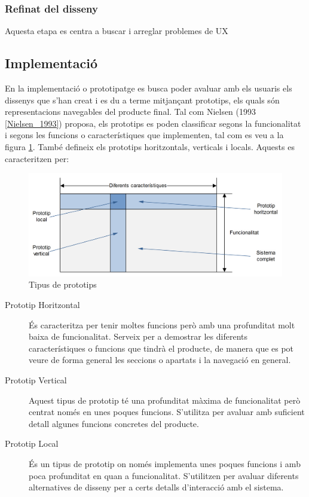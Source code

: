 \subsubsection{Refinat del disseny}
Aquesta etapa es centra a buscar i arreglar problemes de \ac{UX} 


\subsection{Implementació}\label{subsec:implementation}
En la implementació o prototipatge es busca poder avaluar amb els usuaris els dissenys que s'han creat i es du a terme mitjançant prototips, els quals són representacions navegables del producte final. Tal com Nielsen (1993 \ref{Nielsen_1993}) proposa, els prototips es poden classificar segons la funcionalitat i segons les funcions o característiques que implementen, tal com es veu a la figura \ref{fig:types_prototypes}. També defineix els prototips horitzontals, verticals i locals. Aquests es caracteritzen per:

\begin{figure}[ht]
\centering
\includegraphics[scale=0.8]{Types_prototypes.png}
\caption{Tipus de prototips}\label{fig:types_prototypes}
\end{figure}

\begin{description}
\item[Prototip Horitzontal] És caracteritza per tenir moltes funcions però amb una profunditat molt baixa de funcionalitat. Serveix per a demostrar les diferents característiques o funcions que tindrà el producte, de manera que es pot veure de forma general les seccions o apartats i la navegació en general.
\item[Prototip Vertical] Aquest tipus de prototip té una profunditat màxima de funcionalitat però centrat només en unes poques funcions. S'utilitza per avaluar amb suficient detall algunes funcions concretes del producte. 
\item[Prototip Local] És un tipus de prototip on només implementa unes poques funcions i amb poca profunditat en quan a funcionalitat. S'utilitzen per avaluar diferents alternatives de disseny per a certs detalls d'interacció amb el sistema. 
\end{description}

